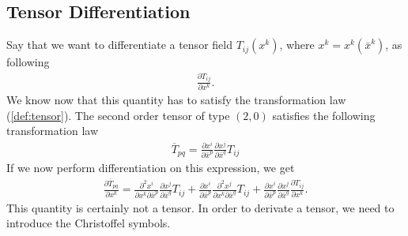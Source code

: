 \documentclass[main.tex]{subfiles}
\begin{document}
\subsection{Tensor Differentiation}
Say that we want to differentiate a tensor field $T_{ij}(x^k)$, where $x^k = x^k(\bar{x}^k)$, as following
\begin{align*}
\frac{\partial T_{ij}}{\partial x^k}.
\end{align*}
We know now that this quantity has to satisfy the transformation law (\ref{def:tensor}).
The second order tensor of type $(2,0)$ satisfies the following transformation law
\begin{align*}
\overline{T}_{pq} = \frac{\partial x^i}{\partial \bar{x}^p}\frac{\partial x^j}{\partial \bar{x}^q} T_{ij}
\end{align*}
If we now perform differentiation on this expression, we get
\begin{align*}
\frac{\partial \overline{T}_{pq}}{\partial x^k} = 
\frac{\partial^2 x^i}{\partial x^k \partial \bar{x}^p}\frac{\partial x^j}{\partial \bar{x}^q} T_{ij} + 
\frac{\partial x^i}{\partial \bar{x}^p}\frac{\partial^2 x^j}{\partial x^k \partial \bar{x}^q} T_{ij} +
\frac{\partial x^i}{\partial \bar{x}^p}\frac{\partial x^j}{\partial \bar{x}^q}
\frac{\partial T_{ij}}{\partial x^k}.
\end{align*}
This quantity is certainly not a tensor. In order to derivate a tensor, we need to introduce
the Christoffel symbols.  
\end{document}
